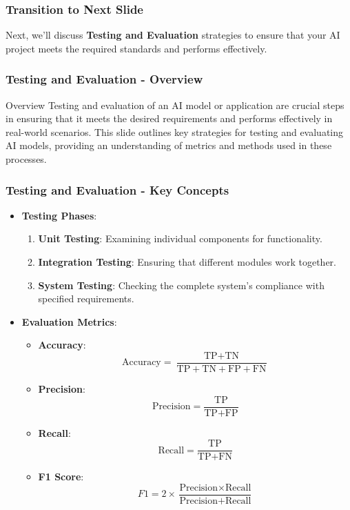 \documentclass[aspectratio=169]{beamer}
\begin{document}
\begin{frame}[fragile]
    \frametitle{Transition to Next Slide}
    Next, we'll discuss \textbf{Testing and Evaluation} strategies to ensure that your AI project meets the required standards and performs effectively.
\end{frame}

\begin{frame}[fragile]
    \frametitle{Testing and Evaluation - Overview}
    \begin{block}{Overview}
        Testing and evaluation of an AI model or application are crucial steps in ensuring that it meets the desired requirements and performs effectively in real-world scenarios. This slide outlines key strategies for testing and evaluating AI models, providing an understanding of metrics and methods used in these processes.
    \end{block}
\end{frame}

\begin{frame}[fragile]
    \frametitle{Testing and Evaluation - Key Concepts}
    \begin{itemize}
        \item \textbf{Testing Phases}:
        \begin{enumerate}
            \item \textbf{Unit Testing}: Examining individual components for functionality. 
            \item \textbf{Integration Testing}: Ensuring that different modules work together.
            \item \textbf{System Testing}: Checking the complete system's compliance with specified requirements.
        \end{enumerate}
        
        \item \textbf{Evaluation Metrics}:
        \begin{itemize}
            \item \textbf{Accuracy}:
            \[
            \text{Accuracy} = \frac{\text{TP} + \text{TN}}{\text{TP} + \text{TN} + \text{FP} + \text{FN}}
            \]
            \item \textbf{Precision}:
            \[
            \text{Precision} = \frac{\text{TP}}{\text{TP} + \text{FP}}
            \]
            \item \textbf{Recall}:
            \[
            \text{Recall} = \frac{\text{TP}}{\text{TP} + \text{FN}}
            \]
            \item \textbf{F1 Score}:
            \[
            F1 = 2 \times \frac{\text{Precision} \times \text{Recall}}{\text{Precision} + \text{Recall}}
            \]
        \end{itemize}
    \end{itemize}
\end{frame}
\end{document}
